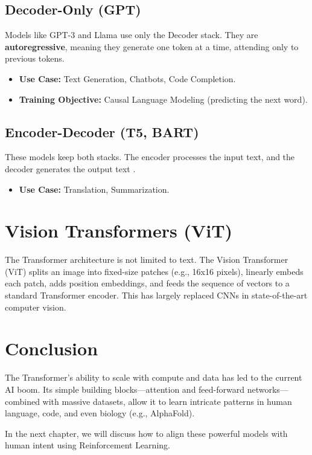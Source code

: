 \subsection{Decoder-Only (GPT)}
Models like GPT-3 \cite{brown2020language} and Llama \cite{touvron2023llama} use only the Decoder stack. They are \textbf{autoregressive}, meaning they generate one token at a time, attending only to previous tokens.
\begin{itemize}
    \item \textbf{Use Case:} Text Generation, Chatbots, Code Completion.
    \item \textbf{Training Objective:} Causal Language Modeling (predicting the next word).
\end{itemize}

\subsection{Encoder-Decoder (T5, BART)}
These models keep both stacks. The encoder processes the input text, and the decoder generates the output text \cite{raffel2020exploring}.
\begin{itemize}
    \item \textbf{Use Case:} Translation, Summarization.
\end{itemize}

\section{Vision Transformers (ViT)}

The Transformer architecture is not limited to text. The Vision Transformer (ViT) \cite{dosovitskiy2020image} splits an image into fixed-size patches (e.g., 16x16 pixels), linearly embeds each patch, adds position embeddings, and feeds the sequence of vectors to a standard Transformer encoder. This has largely replaced CNNs in state-of-the-art computer vision.

\section{Conclusion}

The Transformer's ability to scale with compute and data has led to the current AI boom. Its simple building blocks---attention and feed-forward networks---combined with massive datasets, allow it to learn intricate patterns in human language, code, and even biology (e.g., AlphaFold).

In the next chapter, we will discuss how to align these powerful models with human intent using Reinforcement Learning.
